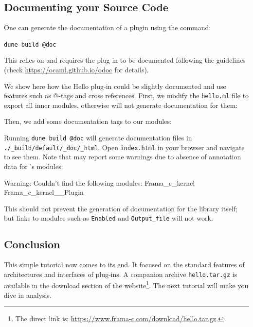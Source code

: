 \subsection{Documenting your Source Code}
\label{tut2:doc}

One can generate the documentation of a plugin using the command:

\lstinline{dune build @doc}

This relies on \odoc and requires the plug-in to be documented following the
\odoc guidelines (check \url{https://ocaml.github.io/odoc} for details).

We show here how the Hello plug-in could be slightly documented and use
\odoc features such as @-tags and cross references. First, we modify the
\texttt{hello.ml} file to export all inner modules, otherwise \odoc will not
generate documentation for them:


Then, we add some documentation tags to our modules:




Running \verb|dune build @doc| will generate documentation files in
\texttt{./\_build/default/\_doc/\_html}. Open \texttt{index.html} in your
browser and navigate to see them. Note that \odoc may report some warnings
due to absence of annotation data for \framac's modules:

\begin{shell}
Warning: Couldn't find the following modules:
  Frama_c_kernel Frama_c_kernel__Plugin
\end{shell}

This should not prevent the generation of documentation for the library itself;
but links to modules such as \texttt{Enabled} and \texttt{Output\_file} will
not work.

\subsection{Conclusion}

This simple tutorial now comes to its end. It focused on the standard features
of architectures and interfaces of \framac plug-ins. A companion archive
\texttt{hello.tar.gz} is available in the download section of the \framac
website\footnote{The direct link is:
\url{https://www.frama-c.com/download/hello.tar.gz}.}.
The next tutorial will make you dive in \C analysis.

